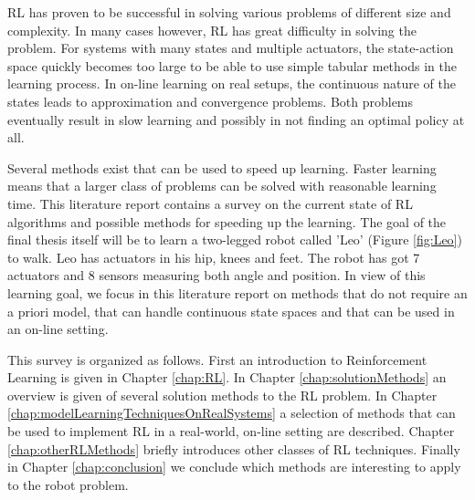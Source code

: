 \documentclass[a4paper,11pt]{mscLiterature}
\begin{document}
	RL has proven to be successful in solving various problems of different size and complexity. In many cases however, RL has great difficulty in solving the problem. For systems with many states and multiple actuators, the state-action space quickly becomes too large to be able to use simple tabular methods in the learning process. In on-line learning on real setups, the continuous nature of the states leads to approximation and convergence problems. Both problems eventually result in slow learning and possibly in not finding an optimal policy at all.
	
	Several methods exist that can be used to speed up learning. Faster learning means that a larger class of problems can be solved with reasonable learning time. This literature report contains a survey on the current state of RL algorithms and possible methods for speeding up the learning. The goal of the final thesis itself will be to learn a two-legged robot called 'Leo' (Figure \ref{fig:Leo}) to walk. Leo has actuators in his hip, knees and feet. The robot has got 7 actuators and 8 sensors measuring both angle and position. In view of this learning goal, we focus in this literature report on methods that do not require an a priori model, that can handle continuous state spaces and that can be used in an on-line setting.
	
	This survey is organized as follows. First an introduction to Reinforcement Learning is given in Chapter \ref{chap:RL}. In Chapter \ref{chap:solutionMethods} an overview is given of several solution methods to the RL problem. In Chapter \ref{chap:modelLearningTechniquesOnRealSystems} a selection of methods that can be used to implement RL in a real-world, on-line setting are described. Chapter \ref{chap:otherRLMethods} briefly introduces other classes of RL techniques. Finally in Chapter \ref{chap:conclusion} we conclude which methods are interesting to apply to the robot problem.
	
\end{document}
